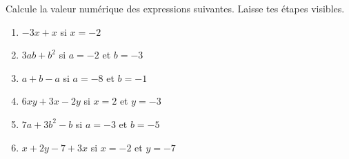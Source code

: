 %
%
    Calcule la valeur numérique des expressions suivantes. Laisse tes étapes visibles.
    \begin{enumerate}[cols=2, itemsep=4cm]
        \item \(-3x +x\) si \(x=-2\)
        \item \(3ab + b^2\) si \(a=-2\) et \(b=-3\)
        \item \(a + b - a\) si \(a=-8\) et \(b=-1\)
        \item \(6xy + 3x - 2y\) si \(x=2\) et \(y=-3\)
        \item \(7a + 3b^2 - b\) si \(a=-3\) et \(b=-5\)
        \item \(x + 2y - 7 + 3x\) si \(x=-2\) et \(y=-7\)
    \end{enumerate}
    \vspace{4cm}
